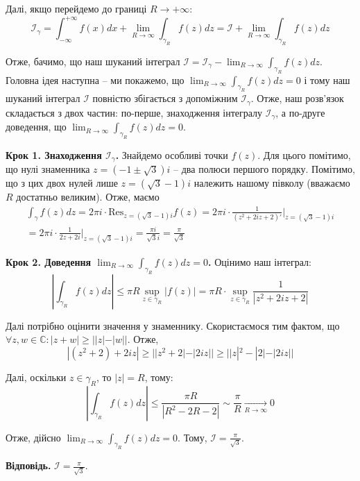 \documentclass[oneside,solution]{karazin-complan-assign}
\begin{document}
Далі, якщо перейдемо до границі $R \to +\infty$:
\begin{equation}
    \mathcal{I}_{\gamma} = \int_{-\infty}^{+\infty} f(x)dx + \lim_{R \to \infty}\int_{\gamma_R} f(z)dz = \mathcal{I} + \lim_{R \to \infty} \int_{\gamma_R} f(z)dz
\end{equation}

Отже, бачимо, що наш шуканий інтеграл $\mathcal{I} = \mathcal{I}_{\gamma} - \lim_{R \to \infty}\int_{\gamma_R}f(z)dz$. Головна ідея наступна -- ми покажемо, що $\lim_{R \to \infty}\int_{\gamma_R}f(z)dz=0$ і тому наш шуканий інтеграл $\mathcal{I}$ повністю збігається з допоміжним $\mathcal{I}_{\gamma}$. Отже, наш розв'язок складається з двох частин: по-перше, знаходження інтегралу $\mathcal{I}_{\gamma}$, а по-друге доведення, що $\lim_{R \to \infty}\int_{\gamma_R}f(z)dz=0$. 

\textbf{Крок 1. Знаходження $\mathcal{I}_{\gamma}$.} Знайдемо особливі точки $f(z)$. Для цього помітимо, що нулі знаменника $z=(-1 \pm \sqrt{3})i$ -- два полюси першого порядку. Помітимо, що з цих двох нулей лише $z=(\sqrt{3}-1)i$ належить нашому півколу (вважаємо $R$ достатньо великим). Отже, маємо
\begin{gather}
    \int_{\gamma} f(z)dz = 2\pi i \cdot \text{Res}_{z=(\sqrt{3}-1)i}f(z) = 2\pi i \cdot \frac{1}{(z^2+2iz+2)'}\Big|_{z=(\sqrt{3}-1)i} \nonumber \\
    = 2\pi i \cdot \frac{1}{2z + 2i}\Big|_{z=(\sqrt{3}-1)i} = \frac{\pi i}{\sqrt{3}i} = \frac{\pi}{\sqrt{3}}
\end{gather}

\textbf{Крок 2. Доведення $\lim_{R \to \infty}\int_{\gamma_R}f(z)dz=0$.} Оцінимо наш інтеграл:
\begin{equation}
    \left|\int_{\gamma_R} f(z)dz \right| \leq \pi R \sup_{z \in \gamma_R} |f(z)| = \pi R \cdot \sup_{z \in \gamma_R}\frac{1}{|z^2+2iz + 2|}
\end{equation}

Далі потрібно оцінити значення у знаменнику. Скористаємося тим фактом, що $\forall z, w \in \mathbb{C}: |z + w| \geq ||z|-|w||$. Отже,
\begin{equation}
    |(z^2+2)+2iz| \geq ||z^2+2| - |2iz|| \geq ||z|^2 - |2| - |2iz||
\end{equation}

Далі, оскільки $z \in \gamma_R$, то $|z| = R$, тому:
\begin{equation}
    \left|\int_{\gamma_R} f(z)dz \right| \leq \frac{\pi R }{|R^2 - 2R - 2|} \sim \frac{\pi}{R} \xrightarrow[R \to \infty]{} 0
\end{equation}

Отже, дійсно $\lim_{R \to \infty}\int_{\gamma_R}f(z)dz=0$. Тому, $\boxed{\mathcal{I} = \frac{\pi}{\sqrt{3}}}$.

\textbf{Відповідь.} $\mathcal{I} = \frac{\pi}{\sqrt{3}}$.
    
\end{document}
